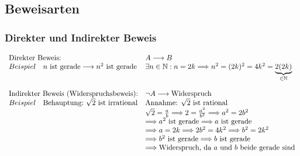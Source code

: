 \documentclass[11pt]{article}
\begin{document}
\subsection{Beweisarten}
\subsubsection{Direkter und Indirekter Beweis}
$
  \begin{array}{l l}
    \text{Direkter Beweis:}                                                 & A \longrightarrow B                                                                        \\
    Beispiel\quad n~\text{ist gerade} \longrightarrow n^2~\text{ist gerade} & \exists n \in \mathbb{N} : n = 2k \Longrightarrow n^2 = (2k)^2 = 4k^2 = \underbrace{2(2k)}_{\in\mathbb{N}} \\\\
    \text{Indirekter Beweis (Widerspruchsbeweis):}                          & \lnot A \longrightarrow\text{Widerspruch}                                                  \\
    Beispiel\quad\text{Behauptung:~}\sqrt{2}~\text{ist irrational}          & \text{Annahme: }\sqrt{2}~\text{ist rational}                                               \\
                                                                            & \sqrt{2} = \frac{a}{b} \Longrightarrow 2 = \frac{a^2}{b^2} \Longrightarrow a^2 = 2b^2      \\
                                                                            & \Longrightarrow a^2~\text{ist gerade} \Longrightarrow a~\text{ist gerade}                  \\
                                                                            & \Longrightarrow a = 2k \Longrightarrow 2b^2 = 4k^2 \Longrightarrow b^2 = 2k^2              \\
                                                                            & \Longrightarrow b^2~\text{ist gerade} \Longrightarrow b~\text{ist gerade}                  \\
                                                                            & \Longrightarrow \text{Widerspruch, da }a~\text{und }b~\text{beide gerade sind}             \\
  \end{array}
$
\end{document}
